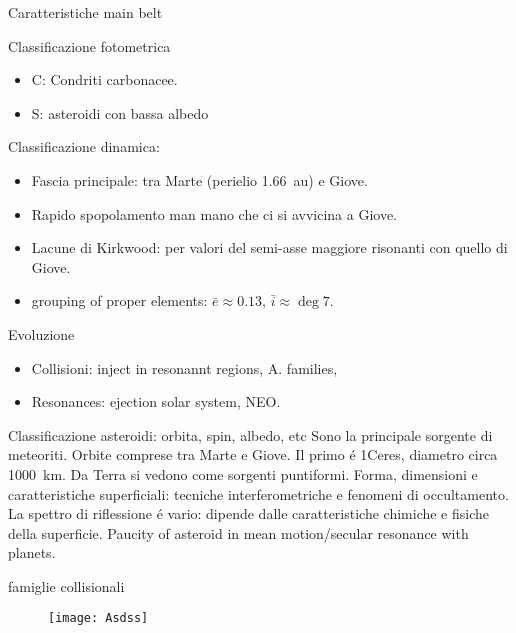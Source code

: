 \begin{frame}{Caratteristiche main belt}
\begin{block}{Classificazione fotometrica}
\begin{itemize}
    \item C: Condriti carbonacee.
    \item S: asteroidi con bassa albedo
\end{itemize}
\end{block}
\begin{block}{Classificazione dinamica:}
\begin{itemize}
\item Fascia principale: tra Marte (perielio \SI{1.66}{\astronomicalunit}) e Giove.
\item Rapido spopolamento man mano che ci si avvicina a Giove.
\item Lacune di Kirkwood: per valori del semi-asse maggiore risonanti con quello di Giove.
\item grouping of proper elements: $\bar{e}\approx0.13$, $\bar{i}\approx\deg{7}$.
\end{itemize}
\end{block}
\begin{block}{Evoluzione}
\begin{itemize}
\item Collisioni: inject in resonannt regions, A. families,
\item Resonances: ejection solar system, NEO.
\end{itemize}
\end{block}
\end{frame}

\begin{wordonframe}{Classificazione asteroidi: orbita, spin, albedo, etc}
Sono la principale sorgente di meteoriti.
Orbite comprese tra Marte e Giove. Il primo \'e 1Ceres, diametro circa \SI{1000}{\kilo\meter}.
Da Terra si vedono come sorgenti puntiformi. Forma, dimensioni e caratteristiche superficiali: tecniche interferometriche e fenomeni di occultamento.
La spettro di riflessione \'e vario: dipende dalle caratteristiche chimiche e fisiche della superficie.
Paucity of asteroid in mean motion/secular resonance with planets.
\end{wordonframe}

\begin{frame}{famiglie collisionali}
\begin{figure}[!ht]
\texttt{[image: Asdss]}
\end{figure}
\end{frame}

